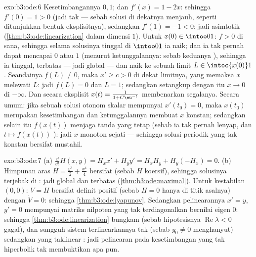 \begin{solution}{exo:b3:ode:6}
Kesetimbangannya $0, 1$; dan $f'(x) = 1 - 2x$: sehingga $f'(0) = 1 > 0$
(jadi tak  --- sebab solusi di dekatnya menjauh, seperti ditunjukkan
bentuk eksplisitnya), sedangkan $f'(1) = -1 < 0$: jadi  asimtotik
(\cref{thm:b3:ode:linearization} dalam dimensi $1$). Untuk
$x(0) \in \intoo01$: $f > 0$ di sana, sehingga selama
solusinya tinggal di $\intoo01$ ia naik; dan ia tak pernah dapat mencapai
$0$ atau $1$ (menurut ketunggalannya: sebab keduanya ), sehingga ia tinggal,
terbatas --- jadi global --- dan naik ke sebuah limit $L
\in \intoc{x(0)}1$. Seandainya $f(L) \neq 0$, maka $x' \geq c > 0$
di dekat limitnya, yang memaksa $x$ melewati $L$: jadi $f(L) = 0$ dan $L = 1$;
sedangkan setangkup dengan itu $x \to 0$ di $-\infty$. Dan secara eksplisit $x(t) =
\frac1{1 + C\eu^{-t}}$ membenarkan segalanya. Secara umum: jika sebuah
solusi otonom skalar mempunyai $x'(t_0) = 0$, maka $x(t_0)$
merupakan kesetimbangan dan ketunggalannya membuat $x$ konstan;
sedangkan selain itu $f(x(t))$ menjaga tanda yang tetap (sebab ia tak pernah lenyap,
dan $t \mapsto f(x(t))$ ): jadi $x$ monoton
sejati --- sehingga solusi periodik yang tak konstan bersifat
mustahil.
\end{solution}

\begin{solution}{exo:b3:ode:7}
(a) $\frac{\dd}{\dd t}H(x,y) = H_xx' + H_yy' = H_xH_y +
H_y(-H_x) = 0$.
(b) Himpunan aras $H = \frac{y^2}2 + \frac{x^4}4$ bersifat
 (sebab $H$ koersif), sehingga solusinya terjebak di :
jadi global dan terbatas (\cref{thm:b3:ode:maximal}). Untuk kestabilan
$(0,0)$: $V = H$ bersifat definit positif (sebab $H = 0$ hanya di
titik asalnya) dengan $\dot V = 0$: sehingga \cref{thm:b3:ode:lyapunov}. Sedangkan
pelinearannya $x' = y$, $y' = 0$ mempunyai matriks nilpoten
yang tak terdiagonalkan bernilai eigen $0$:
sehingga \cref{thm:b3:ode:linearization} bungkam (sebab hipotesisnya
$\operatorname{Re}\lambda < 0$ gagal), dan sungguh
sistem terlinearkannya tak  (sebab $y_0 \ne 0$ menghanyut) sedangkan
yang taklinear : jadi pelinearan pada kesetimbangan yang tak
hiperbolik tak membuktikan apa pun.
\end{solution}

